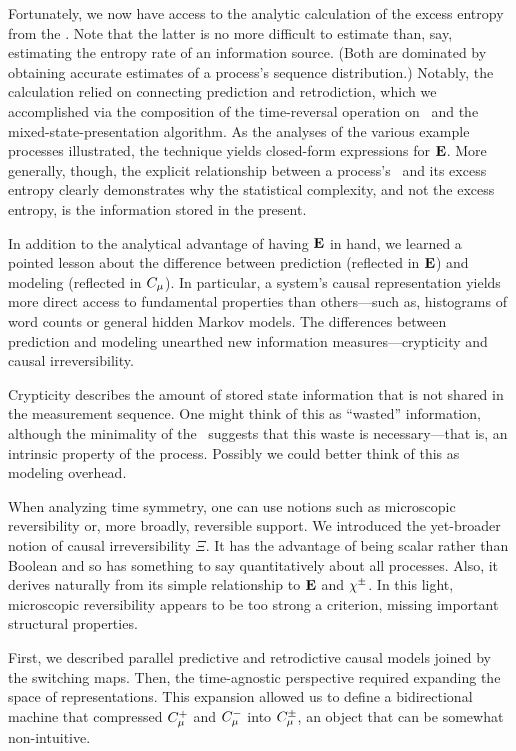 Fortunately, we now have access to the analytic calculation of the excess
entropy from the \eM. Note that the latter is no more difficult to estimate
than, say, estimating the entropy rate of an information source. (Both are
dominated by obtaining accurate estimates of a process's sequence distribution.)
Notably,
the calculation relied on connecting prediction and retrodiction, which we
accomplished via the composition of the time-reversal operation on \eMs\ and
the mixed-state-presentation algorithm. As the analyses of the various example
processes illustrated, the technique yields closed-form expressions for ${\bf E}$.
More generally, though, the explicit relationship between a process's \eM\ and
its excess entropy clearly demonstrates why the statistical complexity, and
not the excess entropy, is the information stored in the present.

In addition to the analytical advantage of having ${\bf E}$ in hand, we learned a
pointed lesson about the difference between prediction (reflected
in ${\bf E}$) and modeling (reflected in $C_\mu$). In
particular, a system's causal representation yields more direct access to
fundamental properties than others---such as, histograms of word counts or
general hidden Markov models. The differences between prediction and modeling
unearthed new information measures---crypticity and causal irreversibility.

Crypticity describes the amount of stored state information that is not shared
in the measurement sequence. One might think of this as ``wasted'' information, 
although the minimality of the \eM\ suggests that this waste is necessary---that
is, an intrinsic property of the process. Possibly we could better think of
this as modeling overhead.

When analyzing time symmetry, one can use notions such as microscopic
reversibility or, more broadly, reversible support. We introduced the
yet-broader notion of causal irreversibility $\Xi$. It has the advantage of
being scalar rather than Boolean and so has something to say quantitatively
about all processes. Also, it derives naturally from its simple relationship to
${\bf E}$ and $\chi^\pm$. In this light, microscopic reversibility appears to be too
strong a criterion, missing important structural properties.

First, we described parallel predictive and retrodictive causal models joined
by the switching maps. Then, the time-agnostic perspective required expanding 
the space of representations. This expansion allowed us to define a 
bidirectional machine that compressed $C_\mu^{+}$ and $C_\mu^{-}$ into $C_\mu^{\pm}$, 
an object that can be somewhat non-intuitive.

